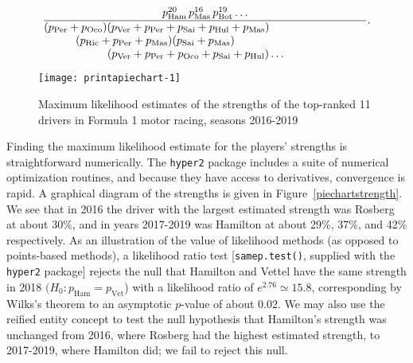 \documentclass[a4,12pt]{article}
\begin{document}
\newcommand{\pham}{p_\mathrm{Ham}}
\newcommand{\pvet}{p_\mathrm{Vet}}
\newcommand{\pbot}{p_\mathrm{Bot}}
\newcommand{\prai}{p_\mathrm{Rai}}
\newcommand{\pric}{p_\mathrm{Ric}}
\newcommand{\pver}{p_\mathrm{Ver}}
\newcommand{\pper}{p_\mathrm{Per}}
\newcommand{\poco}{p_\mathrm{Oco}}
\newcommand{\psai}{p_\mathrm{Sai}}
\newcommand{\phul}{p_\mathrm{H\"{u}l}}
\newcommand{\pmas}{p_\mathrm{Mas}}

\begin{equation}
\frac{p_\mathrm{Ham}^{20}\,p_\mathrm{Mas}^{16}\,p_\mathrm{Bot}^{19}\ldots
}{\parbox{4in}{$(p_\mathrm{Per}+p_\mathrm{Oco})(p_\mathrm{Ver}+p_\mathrm{Per}+p_\mathrm{Sai}+p_\mathrm{Hul}+p_\mathrm{Mas})\\
    \rule{10mm}{0mm}(p_\mathrm{Ric}+p_\mathrm{Per}+p_\mathrm{Mas})(p_\mathrm{Sai}+p_\mathrm{Mas})\\ \rule{20mm}{0mm}
    (p_\mathrm{Ver}+ p_\mathrm{Per}+ p_\mathrm{Oco}+ p_\mathrm{Sai}+ p_\mathrm{Hul})\ldots
     $}}.
 \end{equation}

\begin{figure}
{\centering \texttt{[image: printapiechart-1]}}
\caption[\doublespacing Maximum likelihood estimates \label{piechartstrength} of the
  strengths of the top-ranked 11 drivers in Formula 1 motor racing,
  seasons 2016-2019]{\doublespacing Maximum likelihood
  estimates \label{piechartstrength} of the strengths of the
  top-ranked 11 drivers in Formula 1 motor racing, seasons
  2016-2019}\label{fig:printapiechart}
\end{figure}

Finding the maximum likelihood estimate for the players' strengths is
straightforward numerically. The \texttt{hyper2} package includes a
suite of numerical optimization routines, and because they have access
to derivatives, convergence is rapid.  A graphical diagram of the
strengths is given in Figure~\ref{piechartstrength}.  We see that in
2016 the driver with the largest estimated strength was Rosberg at
about 30\%, and in years 2017-2019 was Hamilton at about 29\%, 37\%,
and 42\% respectively. As an illustration of the value of likelihood
methods (as opposed to points-based methods), a likelihood ratio test
[\texttt{samep.test()}, supplied with the \texttt{hyper2} package]
rejects the null that Hamilton and Vettel have the same strength in
2018 $(H_0\colon p_\mathrm{Ham}= p_\mathrm{Vet}$) with a likelihood
ratio of $e^{2.76}\simeq 15.8$, corresponding by Wilks's theorem to an
asymptotic \(p\)-value of about \(0.02\). We may also use the reified
entity concept to test the null hypothesis that Hamilton's strength
was unchanged from 2016, where Rosberg had the highest estimated
strength, to 2017-2019, where Hamilton did; we fail to reject this
null.
\end{document}
